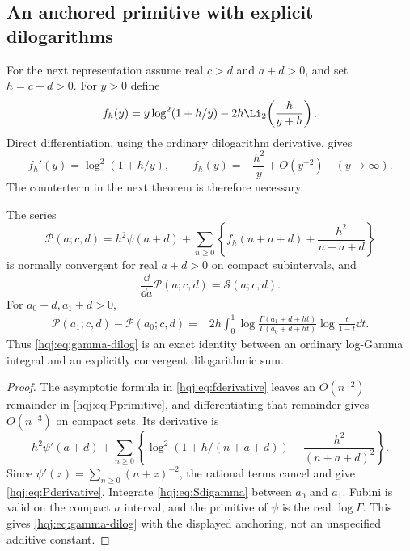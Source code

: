 \subsection{An anchored primitive with explicit dilogarithms}
For the next representation assume real $c>d$ and $a+d>0$, and set $h=c-d>0$.
For $y>0$ define
\begin{equation}\label{hqj:eq:fprimitive}
f_h(y)=y\log^2(1+h/y)-2h\Li_2\!\left(\frac{h}{y+h}\right).
\end{equation}
Direct differentiation, using the ordinary dilogarithm derivative,
gives
\begin{equation}\label{hqj:eq:fderivative}
f_h'(y)=\log^2(1+h/y),\qquad
f_h(y)=-\frac{h^2}{y}+O(y^{-2})\quad(y\longrightarrow\infty).
\end{equation}
The counterterm in the next theorem is therefore necessary.

\begin{theorem}
\label{hqj:thm:primitive}
The series
\begin{equation}\label{hqj:eq:Pprimitive}
\mathscr P(a;c,d)=h^2\psi(a+d)+
\sum_{n\ge0}\left\{f_h(n+a+d)+\frac{h^2}{n+a+d}\right\}
\end{equation}
is normally convergent for real $a+d>0$ on compact subintervals, and
\begin{equation}\label{hqj:eq:Pderivative}
\frac{\dd}{\dd a}\mathscr P(a;c,d)=\mathscr S(a;c,d).
\end{equation}
For $a_0+d,a_1+d>0$,
\begin{align}
\mathscr P(a_1;c,d)-\mathscr P(a_0;c,d)
={}&2h\int_0^1
\log\frac{\Gamma(a_1+d+ht)}{\Gamma(a_0+d+ht)}
\log\frac{t}{1-t}\dd t.
\label{hqj:eq:gamma-dilog}
\end{align}
Thus \eqref{hqj:eq:gamma-dilog} is an exact identity between an ordinary
log-Gamma integral and an explicitly convergent dilogarithmic sum.
\end{theorem}
\begin{proof}
The asymptotic formula in \eqref{hqj:eq:fderivative} leaves an
$O(n^{-2})$ remainder in \eqref{hqj:eq:Pprimitive}, and differentiating
that remainder gives $O(n^{-3})$ on compact sets. Its derivative is
\[
h^2\psi'(a+d)+\sum_{n\ge0}
\left\{\log^2(1+h/(n+a+d))-\frac{h^2}{(n+a+d)^2}\right\}.
\]
Since $\psi'(z)=\sum_{n\ge0}(n+z)^{-2}$, the rational terms cancel
and give \eqref{hqj:eq:Pderivative}. Integrate
\eqref{hqj:eq:Sdigamma} between $a_0$ and $a_1$. Fubini is valid on the
compact $a$ interval, and the primitive of $\psi$ is the real
$\log\Gamma$. This gives \eqref{hqj:eq:gamma-dilog} with the displayed
anchoring, not an unspecified additive constant.
\end{proof}

